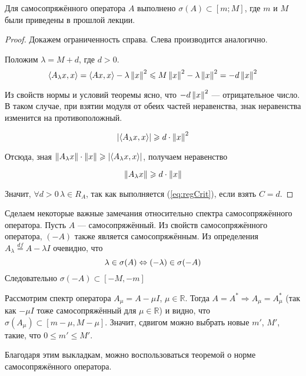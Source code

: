 \documentclass[12pt]{article}
\renewcommand{\mod}[1]{|\! #1 \!|}
\begin{document}
	\begin{theorem}
		Для самосопряжённого оператора $A$ выполнено $\sigma(A) \subset [m;M]$, где $m$ и $M$ были приведены в прошлой лекции.
	\end{theorem}
	\begin{proof}
		Докажем ограниченность справа. Слева производится аналогично.	
	
		Положим $\lambda = M + d$, где $d > 0$.
		$$\left\langle A_{\lambda}x, x \right\rangle = \left\langle Ax, x \right\rangle - \lambda\left\| x \right\|^2 \leqslant M \left\| x \right\|^2 - \lambda\left\| x \right\|^2 = -d\left\| x \right\|^2$$
		
		Из свойств нормы и условий теоремы ясно, что $-d\left\| x \right\|^2$ --- отрицательное число. В таком случае, при взятии модуля
		от обеих частей неравенства, знак неравенства изменится на противоположный.

		$$\mod{\scal{A_{\lambda}x}{x}} \geq d\cdot\norm{x}^2$$
		
		Отсюда, зная $\norm{A_{\lambda}x}\cdot\norm{x} \geq \mod{\scal{A_{\lambda}x}{x}}$, получаем неравенство
		
		$$\left\| A_{\lambda}x \right\| \geqslant d\cdot\left\| x \right\|$$
		
		Значит, $\forall d > 0\, \lambda \in R_A$, так как выполняется (\ref{eq:regCrit}), если взять $C = d$.
	\end{proof}
	
	Сделаем некоторые важные замечания относительно спектра самосопряжённого оператора. Пусть $A$ --- самосопряжённый. Из свойств
	самосопряжённого оператора, $(-A)$ также является самосопряжённым. Из определения $A_{\lambda} \overset{df}{=} A - \lambda I$ 
	очевидно, что
	$$\lambda \in \sigma(A) \Leftrightarrow (-\lambda) \in \sigma(-A)$$
	Следовательно $\sigma(-A) \subset [-M, -m]$
	
	Рассмотрим спектр оператора $A_{\mu} = A - \mu I$, $\mu \in \mathbb{R}$. Тогда $A = A^* \Rightarrow A_{\mu} = A_{\mu}^*$ 
	(так как $-\mu I$ тоже самосопряжённый для $\mu\in\mathbb{R}$) и видно, что $\sigma(A_{\mu}) \subset[m-\mu,M-\mu]$. Значит,
	сдвигом можно выбрать новые $m'$, $M'$, такие, что $0\leq m' \leq M'$.
	
	Благодаря этим выкладкам, можно воспользоваться теоремой о норме самосопряжённого оператора.
	
\end{document}
